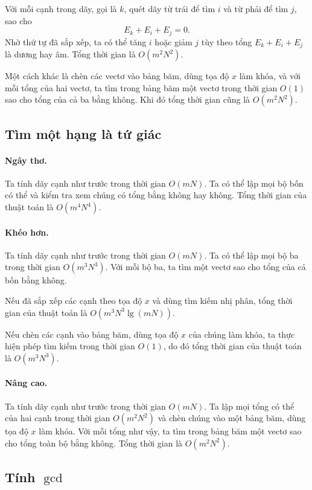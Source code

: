 \documentclass[11pt]{article}
\begin{document}
Với mỗi cạnh trong dãy, gọi là \(k\), quét dãy từ trái để tìm \(i\) và từ phải
để tìm \(j\), sao cho
\[
  E_k+E_i+E_j=0.
\]
Nhờ thứ tự đã sắp xếp, ta có thể tăng \(i\) hoặc giảm \(j\) tùy theo tổng
\(E_k+E_i+E_j\) là dương hay âm. Tổng thời gian là \(O(m^2N^2)\).

Một cách khác là chèn các vectơ vào bảng băm, dùng tọa độ \(x\) làm khóa, và
với mỗi tổng của hai vectơ, ta tìm trong bảng băm một vectơ trong thời gian
\(O(1)\) sao cho tổng của cả ba bằng không. Khi đó tổng thời gian cũng là
\(O(m^2N^2)\).

\subsection{Tìm một hạng là tứ giác}

\paragraph{Ngây thơ.}
Ta tính dãy cạnh như trước trong thời gian \(O(mN)\). Ta có thể lập mọi bộ bốn
có thể và kiểm tra xem chúng có tổng bằng không hay không. Tổng thời gian của
thuật toán là \(O(m^4N^4)\).

\paragraph{Khéo hơn.}
Ta tính dãy cạnh như trước trong thời gian \(O(mN)\). Ta có thể lập mọi bộ ba
trong thời gian \(O(m^3N^3)\). Với mỗi bộ ba, ta tìm một vectơ sao cho tổng của
cả bốn bằng không.

Nếu đã sắp xếp các cạnh theo tọa độ \(x\) và dùng tìm kiếm nhị phân, tổng thời
gian của thuật toán là \(O(m^3N^3\lg(mN))\).

Nếu chèn các cạnh vào bảng băm, dùng tọa độ \(x\) của chúng làm khóa, ta thực
hiện phép tìm kiếm trong thời gian \(O(1)\), do đó tổng thời gian của thuật
toán là \(O(m^3N^3)\).

\paragraph{Nâng cao.}
Ta tính dãy cạnh như trước trong thời gian \(O(mN)\). Ta lập mọi tổng có thể
của hai cạnh trong thời gian \(O(m^2N^2)\) và chèn chúng vào một bảng băm, dùng
tọa độ \(x\) làm khóa. Với mỗi tổng như vậy, ta tìm trong bảng băm một vectơ
sao cho tổng toàn bộ bằng không. Tổng thời gian là \(O(m^2N^2)\).

\subsection{Tính \texorpdfstring{\(\gcd\)}{gcd}}
\end{document}
